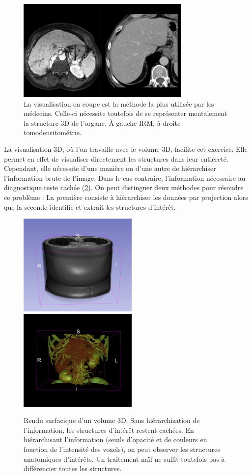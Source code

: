     \begin{figure}[!ht]
      \centering
      \includegraphics[height=5cm]{Images/2D_view.png}
      \caption{La visualisation en coupe est la méthode la plus utilisée par les médecins. Celle-ci nécessite toutefois de se représenter mentalement la structure 3D de l'organe. À gauche IRM, à droite tomodensitométrie.}
      \label{fig:slice_visualization}
    \end{figure}

    La visualisation 3D, où l'on travaille avec le volume 3D, facilite cet exercice. Elle permet en effet de visualiser directement les structures dans leur entièreté. Cependant, elle nécessite d'une manière ou d'une autre de hiérarchiser l'information brute de l'image. Dans le cas contraire, l'information nécessaire au diagnostique reste cachée (\ref{fig:hierachy_3D}). On peut distinguer deux méthodes pour résoudre ce problème : La première consiste à hiérarchiser les données par projection alors que la seconde identifie et extrait les structures d'intérêt.
    
    \begin{figure}[!ht]
      \centering
      \includegraphics[height=5cm]{Images/hierarchy_3D.png}
      \includegraphics[height=5cm]{Images/hierarchy_3D_bis.png}
      \caption{Rendu surfacique d'un volume 3D. Sans hiérarchisation de l'information, les structures d'intérêt restent cachées. En hiérarchisant l'information (seuils d'opacité et de couleurs en fonction de l'intensité des voxels), on peut observer les structures anatomiques d'intérêts. Un traitement naïf ne suffit toutefois pas à différencier toutes les structures.}
      \label{fig:hierachy_3D}
    \end{figure}



